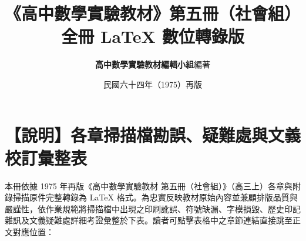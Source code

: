 \documentclass[a4paper,12pt,twoside]{article}
\title{\LARGE\textbf{《高中數學實驗教材》第五冊（社會組）}\\[0.5em] \Large\textbf{全冊 \LaTeX{} 數位轉錄版}}
\author{\textbf{高中數學實驗教材編輯小組}\quad 編著}
\date{民國六十四年（1975）再版}
\begin{document}
\maketitle
\thispagestyle{empty}

\section*{【說明】各章掃描檔勘誤、疑難處與文義校訂彙整表}
\label{sec:master_errata_notes_b5s}
\label{sec:current_errata}

本冊依據 1975 年再版《高中數學實驗教材 第五冊（社會組）》（高三上）各章與附錄掃描原件完整轉錄為 \LaTeX{} 格式。為忠實反映教材原始內容並兼顧排版品質與嚴謹性，依作業規範將掃描檔中出現之印刷訛誤、符號缺漏、字模損毀、歷史印記雜訊及文義疑難處詳細考證彙整於下表。讀者可點擊表格中之章節連結直接跳至正文對應位置：
\end{document}
